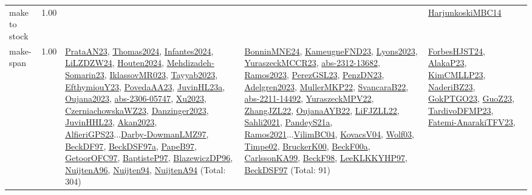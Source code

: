 {\begin{longtable}{p{3cm}r>{\raggedright\arraybackslash}p{6cm}>{\raggedright\arraybackslash}p{6cm}>{\raggedright\arraybackslash}p{8cm}}
\index{make to stock}\index{Concepts!make to stock}make to stock &  1.00 &  &  & \hyperref[detail:HarjunkoskiMBC14]{HarjunkoskiMBC14}\\
\index{make-span}\index{Concepts!make-span}make-span &  1.00 & \hyperref[detail:PrataAN23]{PrataAN23}, \hyperref[detail:Thomas2024]{Thomas2024}, \hyperref[detail:Infantes2024]{Infantes2024}, \hyperref[detail:LiLZDZW24]{LiLZDZW24}, \hyperref[detail:Houten2024]{Houten2024}, \hyperref[detail:Mehdizadeh-Somarin23]{Mehdizadeh-Somarin23}, \hyperref[detail:IklassovMR023]{IklassovMR023}, \hyperref[detail:Tayyab2023]{Tayyab2023}, \hyperref[detail:EfthymiouY23]{EfthymiouY23}, \hyperref[detail:PovedaAA23]{PovedaAA23}, \hyperref[detail:JuvinHL23a]{JuvinHL23a}, \hyperref[detail:Oujana2023]{Oujana2023}, \hyperref[detail:abs-2306-05747]{abs-2306-05747}, \hyperref[detail:Xu2023]{Xu2023}, \hyperref[detail:CzerniachowskaWZ23]{CzerniachowskaWZ23}, \hyperref[detail:Danzinger2023]{Danzinger2023}, \hyperref[detail:JuvinHHL23]{JuvinHHL23}, \hyperref[detail:Akan2023]{Akan2023}, \hyperref[detail:AlfieriGPS23]{AlfieriGPS23}...\hyperref[detail:Darby-DowmanLMZ97]{Darby-DowmanLMZ97}, \hyperref[detail:BeckDF97]{BeckDF97}, \hyperref[detail:BeckDSF97a]{BeckDSF97a}, \hyperref[detail:PapeB97]{PapeB97}, \hyperref[detail:GetoorOFC97]{GetoorOFC97}, \hyperref[detail:BaptisteP97]{BaptisteP97}, \hyperref[detail:BlazewiczDP96]{BlazewiczDP96}, \hyperref[detail:NuijtenA96]{NuijtenA96}, \hyperref[detail:Nuijten94]{Nuijten94}, \hyperref[detail:NuijtenA94]{NuijtenA94} (Total: 304) & \hyperref[detail:BonninMNE24]{BonninMNE24}, \hyperref[detail:KameugneFND23]{KameugneFND23}, \hyperref[detail:Lyons2023]{Lyons2023}, \hyperref[detail:YuraszeckMCCR23]{YuraszeckMCCR23}, \hyperref[detail:abs-2312-13682]{abs-2312-13682}, \hyperref[detail:Ramos2023]{Ramos2023}, \hyperref[detail:PerezGSL23]{PerezGSL23}, \hyperref[detail:PenzDN23]{PenzDN23}, \hyperref[detail:Adelgren2023]{Adelgren2023}, \hyperref[detail:MullerMKP22]{MullerMKP22}, \hyperref[detail:SvancaraB22]{SvancaraB22}, \hyperref[detail:abs-2211-14492]{abs-2211-14492}, \hyperref[detail:YuraszeckMPV22]{YuraszeckMPV22}, \hyperref[detail:ZhangJZL22]{ZhangJZL22}, \hyperref[detail:OujanaAYB22]{OujanaAYB22}, \hyperref[detail:LiFJZLL22]{LiFJZLL22}, \hyperref[detail:Sahli2021]{Sahli2021}, \hyperref[detail:PandeyS21a]{PandeyS21a}, \hyperref[detail:Ramos2021]{Ramos2021}...\hyperref[detail:VilimBC04]{VilimBC04}, \hyperref[detail:KovacsV04]{KovacsV04}, \hyperref[detail:Wolf03]{Wolf03}, \hyperref[detail:Timpe02]{Timpe02}, \hyperref[detail:BruckerK00]{BruckerK00}, \hyperref[detail:BeckF00a]{BeckF00a}, \hyperref[detail:CarlssonKA99]{CarlssonKA99}, \hyperref[detail:BeckF98]{BeckF98}, \hyperref[detail:LeeKLKKYHP97]{LeeKLKKYHP97}, \hyperref[detail:BeckDSF97]{BeckDSF97} (Total: 91) & \hyperref[detail:ForbesHJST24]{ForbesHJST24}, \hyperref[detail:AlakaP23]{AlakaP23}, \hyperref[detail:KimCMLLP23]{KimCMLLP23}, \hyperref[detail:NaderiBZ23]{NaderiBZ23}, \hyperref[detail:GokPTGO23]{GokPTGO23}, \hyperref[detail:GuoZ23]{GuoZ23}, \hyperref[detail:TardivoDFMP23]{TardivoDFMP23}, \hyperref[detail:Fatemi-AnarakiTFV23]{Fatemi-AnarakiTFV23}, 
\end{longtable}}
